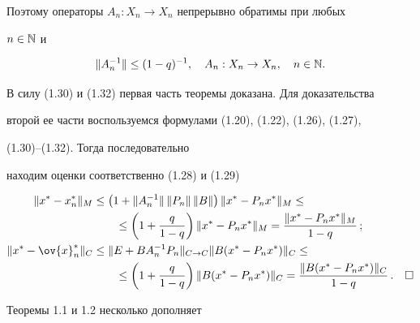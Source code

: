 Поэтому операторы $A_n:X_n\rightarrow X_n$ непрерывно обратимы при любых


$n\in \Bbb N$ и


\begin{equation}


\|A_n^{-1}\|\leq (1-q)^{-1},\quad A_n:X_n\rightarrow X_n,\quad n\in \bl{N}.


\end{equation}


В силу (1.30) и (1.32) первая часть теоремы доказана. Для доказательства


второй ее части воспользуемся формулами (1.20), (1.22), (1.26), (1.27),


(1.30)--(1.32). Тогда последовательно 


находим оценки соответственно (1.28) и (1.29)


\begin{align*}


\|x^*-x_n^*\|_M&\leq \bigl( 1+\|A_n^{-1}\|\, \|P_n\|\, \|B\|\bigr)\,


\|x^*-P_nx^*\|_M\leq \\


%


&\qquad\leq \bigg(1+\frac{q}{1-q}\bigg)\, \|x^*-P_nx^*\|_M=


\frac{\|x^*-P_nx^*\|_M}{1-q} \, ; \\


%


\|x^*-\ov{x}_n^*\|_C&\leq \|E+BA_n^{-1}P_n\|_{C\rightarrow C}


\|B(x^*-P_nx^*)\|_C\leq \\


%


&\qquad\leq \bigg( 1+\frac{q}{1-q}\bigg)\, \|B(x^*-P_nx^*)\|_C=


\frac{\|B(x^*-P_nx^*)\|_C}{1-q} \, .\quad\square


\end{align*}





Теоремы 1.1 и 1.2 несколько дополняет





